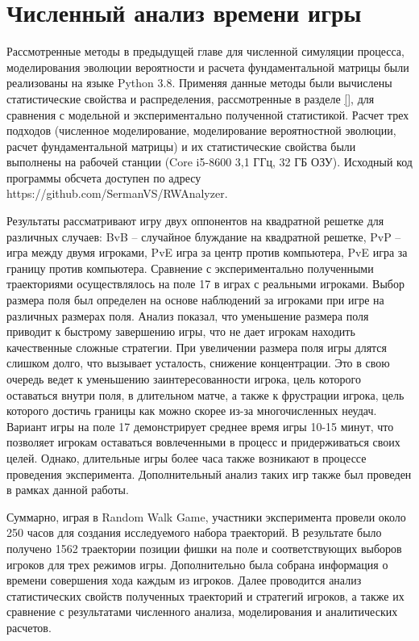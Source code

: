 \chapter{Численный анализ времени игры}\label{ch:ch3}

Рассмотренные методы в предыдущей главе для численной симуляции процесса,
моделирования эволюции вероятности и расчета фундаментальной матрицы 
были реализованы на языке Python 3.8. 
Применяя данные методы были вычислены статистические свойства и распределения, 
рассмотренные в разделе \cref{}, для сравнения с модельной и экспериментально полученной статистикой. 
Расчет трех подходов (численное моделирование, моделирование вероятностной эволюции, расчет фундаментальной матрицы) 
и их статистические свойства были выполнены на рабочей станции (Core i5-8600 3,1 ГГц, 32 ГБ ОЗУ). 
Исходный код программы обсчета доступен по адресу https://github.com/SermanVS/RWAnalyzer.

Результаты рассматривают игру двух оппонентов на квадратной решетке для различных случаев:
BvB -- случайное блуждание на квадратной решетке, PvP -- игра между двумя игроками, PvE игра за центр против компьютера, PvE игра за границу против компьютера. 
Сравнение с экспериментально полученными траекториями осуществлялось на поле 17  в играх с 
реальными игроками. Выбор размера поля был определен на основе наблюдений за игроками при игре на различных размерах поля.
Анализ показал, что уменьшение размера поля приводит к быстрому завершению игры, что не дает игрокам находить качественные сложные
стратегии. При увеличении размера поля игры длятся слишком долго, что вызывает усталость, снижение концентрации.
Это в свою очередь ведет к уменьшению заинтересованности игрока, цель которого оставаться внутри поля, в длительном матче,
а также к фрустрации игрока, цель которого достичь границы как можно скорее из-за многочисленных неудач.
Вариант игры на поле 17  демонстрирует среднее время игры 10-15 минут, что позволяет игрокам оставаться вовлеченными
в процесс и придерживаться своих целей. Однако, длительные игры более часа также возникают в процессе проведения эксперимента.
Дополнительный анализ таких игр также был проведен в рамках данной работы.

Суммарно, играя в Random Walk Game, участники эксперимента провели около 250 часов для создания исследуемого набора траекторий.
В результате было получено 1562 траектории позиции фишки на поле и соответствующих выборов игроков для трех режимов игры. 
Дополнительно была собрана информация о времени совершения хода каждым из игроков. 
Далее проводится анализ статистических свойств полученных траекторий и стратегий игроков, 
а также их сравнение с результатами численного анализа, моделирования и аналитических расчетов.

